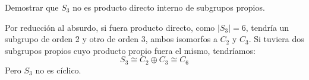 \begin{ejemplo} %
    Demostrar que $S_3$ no es producto directo interno de subgrupos propios.

    Por reducción al absurdo, si fuera producto directo, como $|S_3| = 6$, tendría un subgrupo de orden 2 y otro de orden 3, ambos isomorfos a $C_2$ y $C_3$. Si tuviera dos subgrupos propios cuyo producto propio fuera el mismo, tendríamos:
    \begin{equation*}
        S_3 \cong C_2\oplus C_3\cong C_6
    \end{equation*}
    Pero $S_3$ no es cíclico.
\end{ejemplo}

